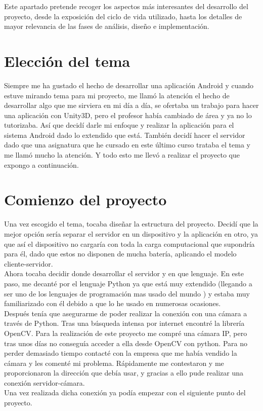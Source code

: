 
Este apartado pretende recoger los aspectos más interesantes del desarrollo del proyecto, desde la exposición del ciclo de vida utilizado, hasta los detalles de mayor relevancia de las fases de análisis, diseño e implementación.

\section{Elección del tema}

Siempre me ha gustado el hecho de desarrollar una aplicación Android y cuando estuve mirando tema para mi proyecto, me llamó la atención el hecho de desarrollar algo que me sirviera en mi día a día, se ofertaba un trabajo para hacer una aplicación con Unity3D, pero el profesor había cambiado de área y ya no lo tutorizaba. 
Así que decidí darle mi enfoque y realizar la aplicación para el sistema Android dado lo extendido que está. 
También decidí hacer el servidor dado que una asignatura que he cursado en este último curso trataba el tema y me llamó mucho la atención. Y todo esto me llevó a realizar el proyecto que expongo a continuación.



\section{Comienzo del proyecto}

Una vez escogido el tema, tocaba diseñar la estructura del proyecto. 
Decidí que la mejor opción sería separar el servidor en un dispositivo y la aplicación en otro, ya que así el dispositivo no cargaría con toda la carga computacional que supondría para él, dado que estos no disponen de mucha batería, aplicando el modelo cliente-servidor.\\
Ahora tocaba decidir donde desarrollar el servidor y en que lenguaje. En este paso, me decanté por el lenguaje Python ya que está muy extendido (llegando a ser uno de los lenguajes de programación mas usado del mundo \cite{pythonuse}) y estaba muy familiarizado con él debido a que lo he usado en numerosas ocasiones.\\
Después tenía que asegurarme de poder realizar la conexión con una cámara a través de Python.
Tras una búsqueda intensa por internet encontré la librería OpenCV. 
Para la realización de este proyecto me compré una cámara IP, pero tras unos días no conseguía acceder a ella desde OpenCV con python. 
Para no perder demasiado tiempo contacté con la empresa que me había vendido la cámara y les comenté mi problema.
Rápidamente me contestaron y me proporcionaron la dirección que debía usar, y gracias a ello pude realizar una conexión servidor-cámara.\\
Una vez realizada dicha conexión ya podía empezar con el siguiente punto del proyecto.



